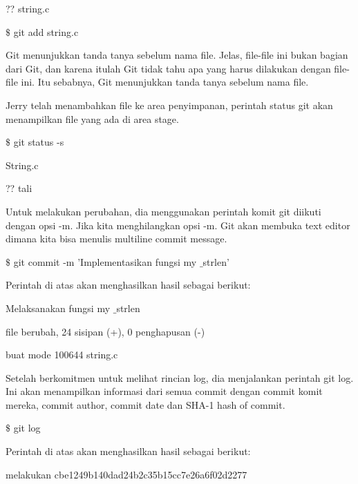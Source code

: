 \noindent 
?? string.c \par
\vspace{12pt}
  $  \$  $ git add string.c \par
\noindent 
Git menunjukkan tanda tanya sebelum nama file. Jelas, file-file ini bukan bagian dari Git, dan karena itulah Git tidak tahu apa yang harus dilakukan dengan file-file ini. Itu sebabnya, Git menunjukkan tanda tanya sebelum nama file. \par
\vspace{12pt}
\noindent 
Jerry telah menambahkan file ke area penyimpanan, perintah status git akan menampilkan file yang ada di area stage. \par
\vspace{12pt}
  $  \$  $ git status -s \par
\noindent 
String.c \par
\noindent 
?? tali \par
\noindent 
Untuk melakukan perubahan, dia menggunakan perintah komit git diikuti dengan opsi -m. Jika kita menghilangkan opsi -m. Git akan membuka text editor dimana kita bisa menulis multiline commit message. \par
\vspace{12pt}
  $  \$  $ git commit -m 'Implementasikan fungsi my $  \_  $strlen' \par
\noindent 
Perintah di atas akan menghasilkan hasil sebagai berikut: \par
\vspace{12pt}
 Melaksanakan fungsi my $  \_  $strlen \par
{} file berubah, 24 sisipan (+), 0 penghapusan (-) \par
\noindent 
buat mode 100644 string.c \par
\noindent 
Setelah berkomitmen untuk melihat rincian log, dia menjalankan perintah git log. Ini akan menampilkan informasi dari semua commit dengan commit komit mereka, commit author, commit date dan SHA-1 hash of commit. \par
\vspace{12pt}
  $  \$  $ git log \par
\noindent 
Perintah di atas akan menghasilkan hasil sebagai berikut: \par
\vspace{12pt}
\noindent 
melakukan cbe1249b140dad24b2c35b15cc7e26a6f02d2277 \par
